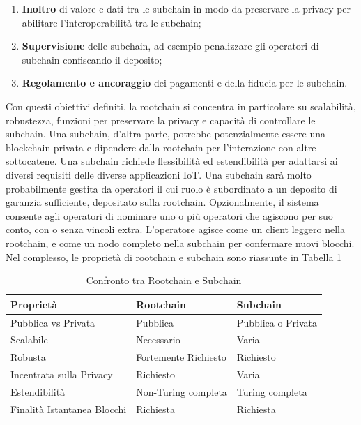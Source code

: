 \documentclass[a4paper,12pt]{article}
\begin{document}
\begin{enumerate}
	\item
	      \textbf{Inoltro} di valore e dati tra le subchain in modo da preservare la privacy per abilitare l'interoperabilità tra le subchain;
	\item
	      \textbf{Supervisione} delle subchain, ad esempio penalizzare gli operatori di subchain confiscando il deposito;
	\item
	      \textbf{Regolamento e ancoraggio} dei pagamenti e della fiducia per le subchain.
\end{enumerate}
Con questi obiettivi definiti, la rootchain si concentra in particolare su scalabilità, robustezza,
funzioni per preservare la privacy e capacità di controllare le subchain.
Una subchain, d'altra parte, potrebbe potenzialmente essere una blockchain privata e dipendere dalla rootchain per l'interazione con altre sottocatene. Una subchain richiede flessibilità
ed estendibilità per adattarsi ai diversi requisiti delle diverse applicazioni IoT. Una subchain sarà molto probabilmente gestita da operatori il cui ruolo è subordinato a un deposito di garanzia sufficiente, depositato sulla rootchain. Opzionalmente, il sistema consente agli operatori di nominare uno o più operatori che agiscono per suo conto, con o senza vincoli extra. L'operatore agisce come un client leggero nella rootchain, e come un nodo completo nella subchain per
confermare nuovi blocchi.
Nel complesso, le proprietà di rootchain e subchain sono riassunte in Tabella \ref{table:rootchainandsubchains}

\begin{table}[tp]%
	\caption{Confronto tra Rootchain e Subchain}
	\label{table:rootchainandsubchains}\centering %
	\begin{tabular}{l|l|l}
		\hline
		\textbf{Proprietà}          & \textbf{Rootchain}   & \textbf{Subchain}  \\
		\hline
		Pubblica vs Privata         & Pubblica             & Pubblica o Privata \\
		Scalabile                   & Necessario           & Varia              \\
		Robusta                     & Fortemente Richiesto & Richiesto          \\
		Incentrata sulla Privacy    & Richiesto            & Varia              \\
		Estendibilità               & Non-Turing completa  & Turing completa    \\
		Finalità Istantanea Blocchi & Richiesta            & Richiesta          \\
		\hline
	\end{tabular}
\end{table}

\pagebreak




\end{document}

